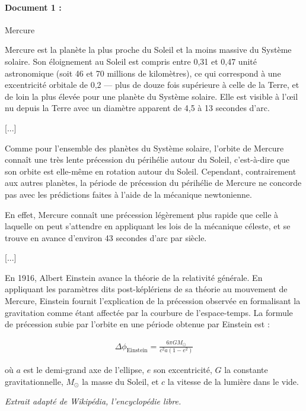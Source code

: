 \paragraph{Document 1 :}\textsf{Mercure}
\begin{center}\begin{minipage}{.9\textwidth}
Mercure est la planète la plus proche du Soleil et la moins massive du Système solaire. Son éloignement au Soleil est compris entre 0,31 et 0,47 unité astronomique (soit 46 et 70 millions de kilomètres), ce qui correspond à une excentricité orbitale de 0,2 — plus de douze fois supérieure à celle de la Terre, et de loin la plus élevée pour une planète du Système solaire. Elle est visible à l'œil nu depuis la Terre avec un diamètre apparent de 4,5 à 13 secondes d'arc. 

[...]

Comme pour l'ensemble des planètes du Système solaire, l'orbite de Mercure connaît une très lente précession du périhélie autour du Soleil, c'est-à-dire que son orbite est elle-même en rotation autour du Soleil. Cependant, contrairement aux autres planètes, la période de précession du périhélie de Mercure ne concorde pas avec les prédictions faites à l'aide de la mécanique newtonienne.

En effet, Mercure connaît une précession légèrement plus rapide que celle à laquelle on peut s'attendre en appliquant les lois de la mécanique céleste, et se trouve en avance d'environ 43 secondes d'arc par siècle. 

[...]

En 1916, Albert Einstein avance la théorie de la relativité générale. En appliquant les paramètres dits post-képlériens de sa théorie au mouvement de Mercure, Einstein fournit l'explication de la précession observée en formalisant la gravitation comme étant affectée par la courbure de l'espace-temps. La formule de précession subie par l'orbite en une période obtenue par Einstein est :

\begin{align*}
    \Delta \phi_{\text{Einstein}} = \frac{6\pi G M_\odot}{c^2 a (1-e^2)}
\end{align*}

où $a$ est le demi-grand axe de l'ellipse, $e$ son excentricité, $G$ la constante gravitationnelle, $M_\odot$ la masse du Soleil, et $c$ la vitesse de la lumière dans le vide.
\end{minipage}\end{center}
\textsl{Extrait adapté de Wikipédia, l'encyclopédie libre.}

